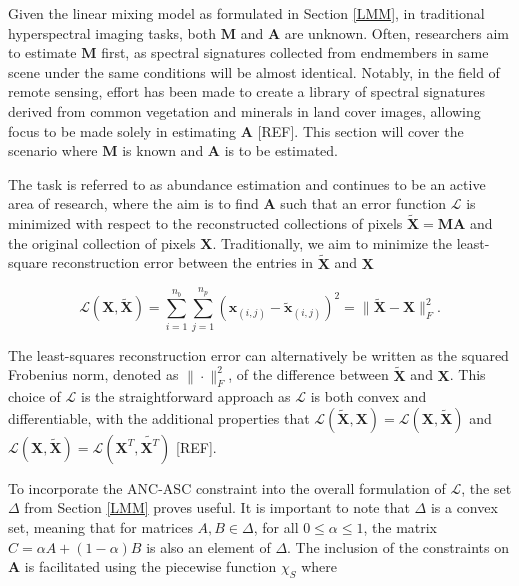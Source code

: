 Given the linear mixing model as formulated in Section \ref{LMM}, in traditional hyperspectral imaging tasks, both $\mathbf{M}$ and $\mathbf{A}$ are unknown. Often, researchers aim to estimate $\mathbf{M}$ first, as spectral signatures collected from endmembers in same scene under the same conditions will be almost identical. Notably, in the field of remote sensing, effort has been made to create a library of spectral signatures derived from common vegetation and minerals in land cover images, allowing focus to be made solely in estimating $\mathbf{A}$ [REF]. This section will cover the scenario where $\mathbf{M}$ is known and $\mathbf{A}$ is to be estimated. 

The task is referred to as abundance estimation and continues to be an active area of research, where the aim is to find $\mathbf{A}$ such that an error function $\mathcal{L}$ is minimized with respect to the reconstructed collections of pixels $\tilde{\mathbf{X}} = \mathbf{MA}$ and the original collection of pixels $\mathbf{X}$. Traditionally, we aim to minimize the least-square reconstruction error between the entries in $\tilde{\mathbf{X}}$ and $\mathbf{X}$

\begin{equation}
    \label{ae:fnorm}
    \mathcal{L}(\mathbf{X},\tilde{\mathbf{X}}) = \sum_{i=1}^{n_b} \sum_{j=1}^{n_p} \left(\mathbf{x}_{(i,j)} - \tilde{\mathbf{x}}_{(i,j)}\right)^2 = \|\tilde{\mathbf{X}} - \mathbf{X}\|_F^2.
\end{equation}

The least-squares reconstruction error can alternatively be written as the squared Frobenius norm, denoted as $\|\cdot\|_F^2$, of the difference between  $\tilde{\mathbf{X}}$ and $\mathbf{X}$. This choice of $\mathcal{L}$ is the straightforward approach as $\mathcal{L}$ is both convex and differentiable, with the additional properties that $\mathcal{L}(\tilde{\mathbf{X}},\mathbf{X}) = \mathcal{L}(\mathbf{X},\tilde{\mathbf{X}})$ and $ \mathcal{L}(\mathbf{X},\tilde{\mathbf{X}}) = \mathcal{L}(\mathbf{X}^T,\tilde{\mathbf{X}^T})$ [REF].

To incorporate the ANC-ASC constraint into the overall formulation of $\mathcal{L}$, the set $\Delta$ from Section \ref{LMM} proves useful. It is important to note that $\Delta$ is a convex set, meaning that for matrices $A, B \in \Delta$, for all $0 \leq \alpha \leq 1$, the matrix $C = \alpha A + (1- \alpha)B$ is also an element of $\Delta$. The inclusion of the constraints on $\mathbf{A}$ is facilitated using the piecewise function $\chi_S$ where

